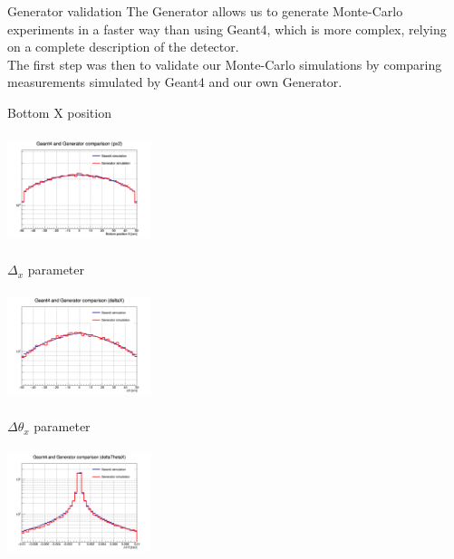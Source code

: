 \documentclass[8 pt]{beamer}
\begin{document}
\begin{frame}{Generator validation}
\justifying
The Generator allows us to generate Monte-Carlo experiments in a faster way than using Geant4, which is more complex, relying on a complete description of the detector. \\ \vspace{10pt}
The first step was then to validate our Monte-Carlo simulations by comparing measurements simulated by Geant4 and our own Generator. \vfill

\begin{minipage}[c]{.32\textwidth}
\begin{exampleblock}{} \begin{center}Bottom X position\end{center} \end{exampleblock}
\includegraphics[width=4.2cm, height=3.2cm]{figs/px2-17p2vs17p2.png} 
\end{minipage}
\begin{minipage}[c]{.32\textwidth}
\begin{exampleblock}{} \begin{center}$\Delta_x$ parameter\end{center} \end{exampleblock}
\includegraphics[width=4.2cm, height=3.2cm]{figs/deltaX-17p2vs17p2.png}
\end{minipage}
\begin{minipage}[c]{.32\textwidth}
\begin{exampleblock}{} \begin{center}$\Delta \theta_x$ parameter\end{center} \end{exampleblock}
\includegraphics[width=4.2cm, height=3.2cm]{figs/deltaThetaX-17p2vs17p2.png}
\end{minipage}

\end{frame}
\end{document}
